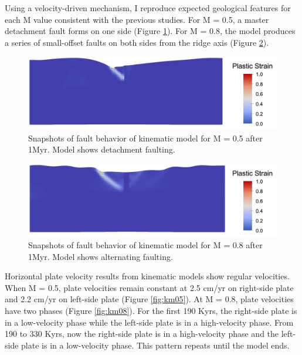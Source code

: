 \documentclass[letterpaper,12pt,notitle]{memphisthesis}                     %
\begin{document}
Using a velocity-driven mechanism, I reproduce expected geological features for each M value consistent with the previous studies. For M = 0.5, a master detachment fault forms on one side (Figure \ref{fig:kfault_m05}). For M = 0.8, the model produces a series of small-offset faults on both sides from the ridge axis (Figure \ref{fig:kfault_m08}).

\begin{figure}[!htb]
	\centering
	\includegraphics[width=0.9\linewidth]{./figs/kfault_m05.png}
	\caption{Snapshots of fault behavior of kinematic model for M = 0.5 after 1Myr. Model shows detachment faulting.}
	\label{fig:kfault_m05}
\end{figure}
\begin{figure}[!htb]
	\centering
	\includegraphics[width=0.9\linewidth]{./figs/kfault_m08.png}
	\caption{Snapshots of fault behavior of kinematic model for M = 0.8 after 1Myr. Model shows alternating faulting.}
	\label{fig:kfault_m08}
\end{figure}

Horizontal plate velocity results from kinematic models show regular velocities. When M = 0.5, plate velocities remain constant at 2.5 cm/yr on right-side plate and 2.2 cm/yr on left-side plate (Figure \ref{fig:km05}). At M = 0.8, plate velocities have two phases (Figure \ref{fig:km08}). For the first 190 Kyrs, the right-side plate is in a low-velocity phase while the left-side plate is in a high-velocity phase. From 190 to 330 Kyrs, now the right-side plate is in a high-velocity phase and the left-side plate is in a low-velocity phase. This pattern repeats until the model ends.
\end{document}
